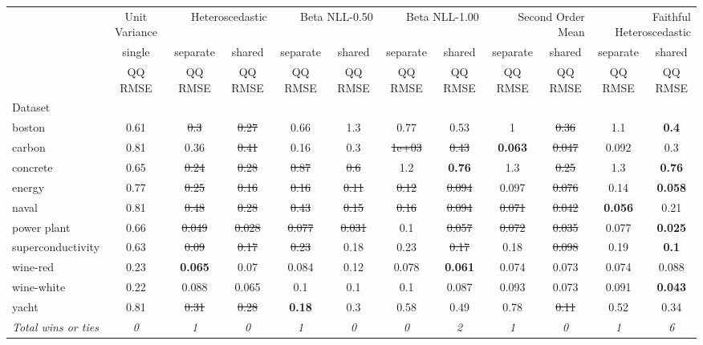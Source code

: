 \begin{tabular}{l|c|cc|cc|cc|cc|cc}
\toprule
{} & {Unit Variance} & \multicolumn{2}{r}{Heteroscedastic} & \multicolumn{2}{r}{Beta NLL-0.50} & \multicolumn{2}{r}{Beta NLL-1.00} & \multicolumn{2}{r}{Second Order Mean} & \multicolumn{2}{r}{Faithful Heteroscedastic} \\
{} & {single} & {separate} & {shared} & {separate} & {shared} & {separate} & {shared} & {separate} & {shared} & {separate} & {shared} \\
{} & {QQ RMSE} & {QQ RMSE} & {QQ RMSE} & {QQ RMSE} & {QQ RMSE} & {QQ RMSE} & {QQ RMSE} & {QQ RMSE} & {QQ RMSE} & {QQ RMSE} & {QQ RMSE} \\
{Dataset} & {} & {} & {} & {} & {} & {} & {} & {} & {} & {} & {} \\
\midrule
boston & 0.61 & \sout{0.3} & \sout{0.27} & 0.66 & 1.3 & 0.77 & 0.53 & 1 & \sout{0.36} & 1.1 & \textbf{0.4} \\
carbon & 0.81 & 0.36 & \sout{0.41} & 0.16 & 0.3 & \sout{1e+03} & \sout{0.43} & \textbf{0.063} & \sout{0.047} & 0.092 & 0.3 \\
concrete & 0.65 & \sout{0.24} & \sout{0.28} & \sout{0.87} & \sout{0.6} & 1.2 & \textbf{0.76} & 1.3 & \sout{0.25} & 1.3 & \textbf{0.76} \\
energy & 0.77 & \sout{0.25} & \sout{0.16} & \sout{0.16} & \sout{0.11} & \sout{0.12} & \sout{0.094} & 0.097 & \sout{0.076} & 0.14 & \textbf{0.058} \\
naval & 0.81 & \sout{0.48} & \sout{0.28} & \sout{0.43} & \sout{0.15} & \sout{0.16} & \sout{0.094} & \sout{0.071} & \sout{0.042} & \textbf{0.056} & 0.21 \\
power plant & 0.66 & \sout{0.049} & \sout{0.028} & \sout{0.077} & \sout{0.031} & 0.1 & \sout{0.057} & \sout{0.072} & \sout{0.035} & 0.077 & \textbf{0.025} \\
superconductivity & 0.63 & \sout{0.09} & \sout{0.17} & \sout{0.23} & 0.18 & 0.23 & \sout{0.17} & 0.18 & \sout{0.098} & 0.19 & \textbf{0.1} \\
wine-red & 0.23 & \textbf{0.065} & 0.07 & 0.084 & 0.12 & 0.078 & \textbf{0.061} & 0.074 & 0.073 & 0.074 & 0.088 \\
wine-white & 0.22 & 0.088 & 0.065 & 0.1 & 0.1 & 0.1 & 0.087 & 0.093 & 0.073 & 0.091 & \textbf{0.043} \\
yacht & 0.81 & \sout{0.31} & \sout{0.28} & \textbf{0.18} & 0.3 & 0.58 & 0.49 & 0.78 & \sout{0.11} & 0.52 & 0.34 \\
\textit{{Total wins or ties}} & \textit{0} & \textit{1} & \textit{0} & \textit{1} & \textit{0} & \textit{0} & \textit{2} & \textit{1} & \textit{0} & \textit{1} & \textit{6} \\
\bottomrule
\end{tabular}
